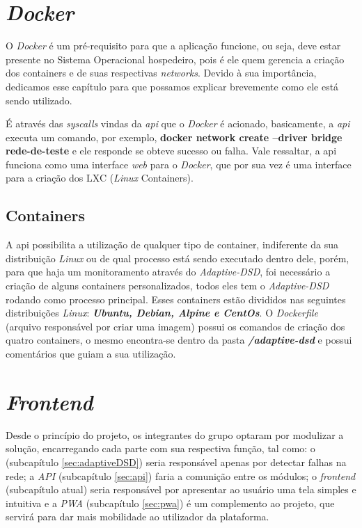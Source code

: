 \section{\textit{Docker}}
\label{sec:docker}

O \textit{Docker} é um pré-requisito para que a aplicação funcione, ou seja, deve estar presente no Sistema Operacional hospedeiro, pois é ele quem gerencia a criação dos containers e de suas respectivas \textit{networks}. Devido à sua importância, dedicamos esse capítulo para que possamos explicar brevemente como ele está sendo utilizado.

É através das \textit{syscalls} vindas da \textit{api} que o \textit{Docker} é acionado, basicamente, a \textit{api} executa um comando, por exemplo, \textbf{docker network create --driver bridge rede-de-teste} e ele responde se obteve sucesso ou falha. Vale ressaltar, a api funciona como uma interface \textit{web} para o \textit{Docker}, que por sua vez é uma interface para a criação dos LXC (\textit{Linux} Containers).

\subsection{Containers}
\label{subsec:containers}

A api possibilita a utilização de qualquer tipo de container, indiferente da sua distribuição \textit{Linux} ou de qual processo está sendo executado dentro dele, porém, para que haja um monitoramento através do \textit{Adaptive-DSD}, foi necessário a criação de alguns containers personalizados, todos eles tem o \textit{Adaptive-DSD} rodando como processo principal. Esses containers estão divididos nas seguintes distribuições \textit{Linux}: \textbf{\textit{Ubuntu, Debian, Alpine e CentOs}}. O \textit{Dockerfile} (arquivo responsável por criar uma imagem) possui os comandos de criação dos quatro containers, o mesmo encontra-se dentro da pasta \textbf{\textit{/adaptive-dsd}} e possui comentários que guiam a sua utilização.



\section{\textit{Frontend}}
\label{sec:frontend}

Desde o princípio do projeto, os integrantes do grupo optaram por modulizar a solução, encarregando cada parte com sua respectiva função, tal como: o \adaptive{} (subcapítulo \ref{sec:adaptiveDSD}) seria responsável apenas por detectar falhas na rede; a \textit{API} (subcapítulo \ref{sec:api}) faria a comunição entre os módulos; o \textit{frontend} (subcapítulo atual) seria responsável por apresentar ao usuário uma tela simples e intuitiva e a \textit{PWA} (subcapítulo \ref{sec:pwa}) é um complemento ao projeto, que servirá para dar mais mobilidade ao utilizador da plataforma.

